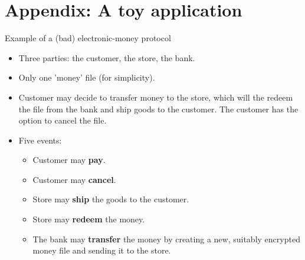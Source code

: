 \documentclass[handout]{beamer}
\begin{document}
\section{Appendix: A toy application}


\begin{frame}{Example of a (bad) electronic-money protocol}

    \begin{itemize}
        \item Three parties: the customer, the store, the bank.
        \item Only one 'money' file (for simplicity).    
        \item Customer may decide to transfer money to the store, which will the redeem the file from the bank and ship goods to the customer. The customer has the option to cancel the file.        
        \item Five events:
        \begin{itemize}
            \item Customer may \textbf{pay}.
            \item Customer may \textbf{cancel}.
            \item Store may \textbf{ship} the goods to the customer.
            \item Store may \textbf{redeem} the money.
            \item The bank may \textbf{transfer} the money by creating a new, suitably encrypted money file and sending it to the store.
        \end{itemize}
    \end{itemize}
    
\end{frame}
\end{document}
